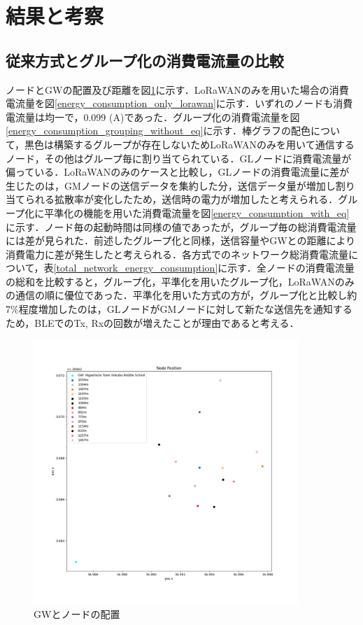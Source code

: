 \documentclass[Japanese]{dicomopapers}
\begin{document}
\section{結果と考察}
\subsection{従来方式とグループ化の消費電流量の比較}
ノードとGWの配置及び距離を図\ref{gw_node_map}に示す．LoRaWANのみを用いた場合の消費電流量を図\ref{energy_consumption_only_lorawan}に示す．いずれのノードも消費電流量は均一で，0.099 (A)であった．グループ化の消費電流量を図\ref{energy_consumption_grouping_without_eq}に示す．棒グラフの配色について，黒色は構築するグループが存在しないためLoRaWANのみを用いて通信するノード，その他はグループ毎に割り当てられている．GLノードに消費電流量が偏っている．LoRaWANのみのケースと比較し，GLノードの消費電流量に差が生じたのは，GMノードの送信データを集約した分，送信データ量が増加し割り当てられる拡散率が変化したため，送信時の電力が増加したと考えられる．グループ化に平準化の機能を用いた消費電流量を図\ref{energy_consumption_with_eq}に示す．ノード毎の起動時間は同様の値であったが，グループ毎の総消費電流量には差が見られた．前述したグループ化と同様，送信容量やGWとの距離により消費電力に差が発生したと考えられる．各方式でのネットワーク総消費電流量について，表\ref{total_network_energy_consumption}に示す．全ノードの消費電流量の総和を比較すると，グループ化，平準化を用いたグループ化，LoRaWANのみの通信の順に優位であった．平準化を用いた方式の方が，グループ化と比較し約7$\%$程度増加したのは，GLノードがGMノードに対して新たな送信先を通知するため，BLEでのTx, Rxの回数が増えたことが理由であると考える．

\begin{figure}[h]
    \centering
    \includegraphics[width=10cm]{img/garbage_box_location.png}
    \caption{GWとノードの配置}
    \label{gw_node_map}
\end{figure}
\end{document}
